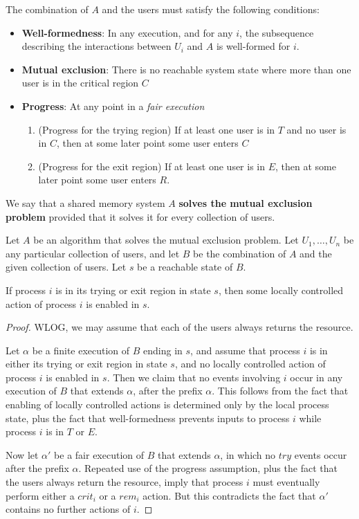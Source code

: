 \documentclass[11pt]{article}
\begin{document}
The combination of \(A\) and the users must satisfy the following conditions:
\begin{itemize}
\item \textbf{Well-formedness}: In any execution, and for any \(i\), the subsequence describing the interactions
between \(U_i\) and \(A\) is well-formed for \(i\).
\item \textbf{Mutual exclusion}: There is no reachable system state where more than one user is in the critical
region \(C\)
\item \textbf{Progress}: At any point in a \emph{fair execution}
\begin{enumerate}
\item (Progress for the trying region) If at least one user is in \(T\) and no user is in \(C\), then
at some later point some user enters \(C\)
\item (Progress for the exit region) If at least one user is in \(E\), then at some later point some
user enters \(R\).
\end{enumerate}
\end{itemize}

We say that a shared memory system \(A\) \textbf{solves the mutual exclusion problem} provided that it solves
it for every collection of users.


\begin{lemma}[]
\label{10.1}
Let \(A\) be an algorithm that solves the mutual exclusion problem. Let \(U_1,\dots,U_n\) be any
particular collection of users, and let \(B\) be the combination of \(A\) and the given collection of
users. Let \(s\) be a reachable state of \(B\).

If process \(i\) is in its trying or exit region in state \(s\), then some locally controlled action
of process \(i\) is enabled in \(s\).
\end{lemma}

\begin{proof}
WLOG, we may assume that each of the users always returns the resource.

Let \(\alpha\) be a finite execution of \(B\) ending in \(s\), and assume that process \(i\) is in
either its trying or exit region in state \(s\), and no locally controlled action of process \(i\) is
enabled in \(s\). Then we claim that no events involving \(i\) occur in any execution of \(B\) that
extends \(\alpha\), after the prefix \(\alpha\). This follows from the fact that enabling of locally
controlled actions is determined only by the local process state, plus the fact that well-formedness
prevents inputs to process \(i\) while process \(i\) is in \(T\) or \(E\).

Now let \(\alpha'\) be a fair execution of \(B\) that extends \(\alpha\), in which no \(try\) events
occur after the prefix \(\alpha\). Repeated use of the progress assumption, plus the fact that the
users always return the resource, imply that process \(i\) must eventually perform either a \(crit_i\)
or a \(rem_i\) action. But this contradicts the fact that \(\alpha'\) contains no further actions of \(i\).
\end{proof}
\end{document}
